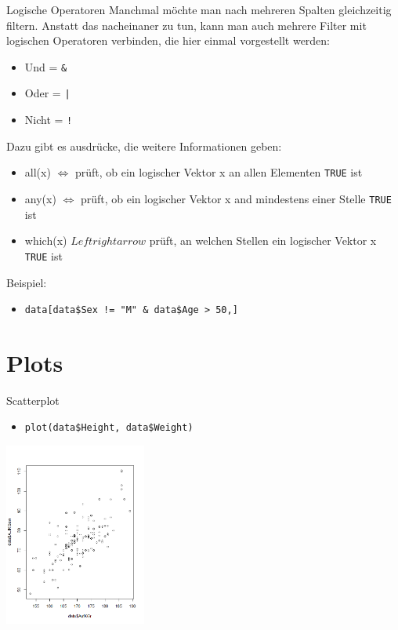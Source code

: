\documentclass[xcolor=dvipsnames, aspectratio = 169]{beamer}
\begin{document}
\begin{frame}[fragile]{Logische Operatoren}
Manchmal möchte man nach mehreren Spalten gleichzeitig filtern. Anstatt das nacheinaner zu tun, kann man auch mehrere Filter mit logischen Operatoren verbinden, die hier einmal vorgestellt werden: \\
\begin{itemize}
			\item  Und = \verb+&+
			\item  Oder = \verb+|+
			\item Nicht = \verb+!+
\end{itemize}
Dazu gibt es ausdrücke, die weitere Informationen geben:
\begin{itemize}
			\item all(x) $\Leftrightarrow$ prüft, ob ein logischer Vektor x an allen Elementen \verb+TRUE+ ist
			\item any(x) $\Leftrightarrow$ prüft, ob ein logischer Vektor x and mindestens einer Stelle \verb+TRUE+ ist
			\item which(x) $Leftrightarrow$ prüft, an welchen Stellen ein logischer Vektor x \verb+TRUE+ ist
\end{itemize}
Beispiel:
	\begin{itemize}
		\item  \verb+data[data$Sex != "M" & data$Age > 50,]+
	\end{itemize}
\end{frame}


\section{Plots}

\begin{frame}[fragile]{Scatterplot}
	\begin{itemize}
		\item \verb+plot(data$Height, data$Weight)+
	\end{itemize}
			
	\begin{center}
		\includegraphics[height=6cm]{Scatterplot}
	\end{center}
\end{frame}
\end{document}
